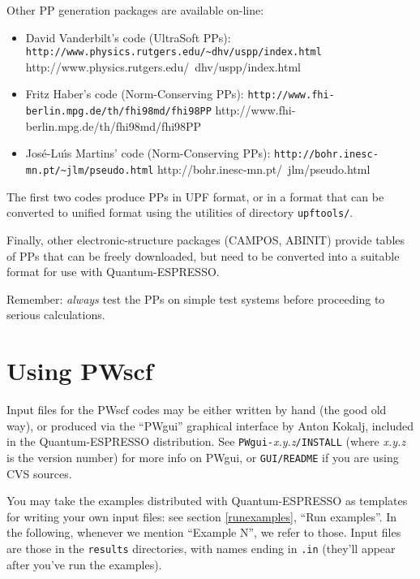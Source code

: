 \documentclass[12pt,a4paper]{article}
\begin{document}
Other PP generation packages are available on-line:

\begin{itemize}
  \item
    David Vanderbilt's code (UltraSoft PPs):\hfill\break
    \htmladdnormallink%
    {\texttt{http://www.physics.rutgers.edu/\~{}dhv/uspp/index.html}}%
    {http://www.physics.rutgers.edu/~dhv/uspp/index.html}
  \item
    Fritz Haber's code (Norm-Conserving PPs):\hfill\break
    \htmladdnormallink%
    {\texttt{http://www.fhi-berlin.mpg.de/th/fhi98md/fhi98PP}}%
    {http://www.fhi-berlin.mpg.de/th/fhi98md/fhi98PP}
  \item
    Jos\'e-Lu\'\i{}s Martins' code (Norm-Conserving PPs):\hfill\break
    \htmladdnormallink%
    {\texttt{http://bohr.inesc-mn.pt/\~{}jlm/pseudo.html}}%
    {http://bohr.inesc-mn.pt/~jlm/pseudo.html}
\end{itemize}

The first two codes produce PPs in UPF format, or in a format that
can be converted to unified format using the utilities of directory
\texttt{upftools/}.

Finally, other electronic-structure packages (CAMPOS, ABINIT)
provide tables of PPs that can be freely downloaded, but need
to be converted into a suitable format for use with Quantum-ESPRESSO.

Remember: \emph{always} test the PPs on simple test systems before
proceeding to serious calculations.

\clearpage

\section{Using PWscf}

Input files for the PWscf codes may be either written by hand (the
good old way), or produced via the ``PWgui'' graphical interface
by Anton Kokalj, included in the Quantum-ESPRESSO distribution.
See \texttt{PWgui-}\emph{x.y.z}\texttt{/INSTALL} (where \emph{x.y.z}
is the version number) for more info on PWgui, or \texttt{GUI/README}
if you are using CVS sources.

You may take the examples distributed with Quantum-ESPRESSO as templates for
writing your own input files: see section \ref{runexamples}, ``Run
examples''.  In the following, whenever we mention ``Example N'', we
refer to those.
Input files are those in the \texttt{results} directories, with names
ending in \texttt{.in} (they'll appear after you've run the examples).
\end{document}
